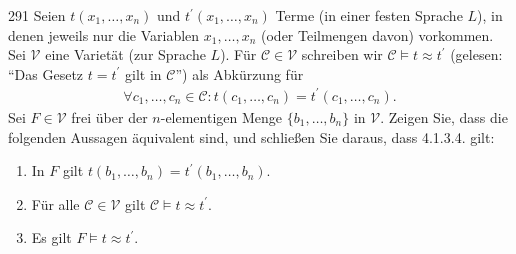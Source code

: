 \begin{algebraUE}{291}
Seien $t(x_1,\dots,x_n)$ und $t^{\prime}(x_1,\dots,x_n)$ Terme (in einer festen
Sprache $L$), in denen jeweils nur die Variablen $x_1,\dots,x_n$ (oder Teilmengen
davon) vorkommen. Sei $\mathcal{V}$ eine Varietät (zur Sprache $L$). Für $\mathcal{C} \in \mathcal{V}$
schreiben wir $\mathcal{C} \vDash t \approx t^{\prime}$ (gelesen: ``Das Gesetz $t = t^{\prime}$
gilt in $\mathcal{C}$'') als Abkürzung für
\begin{align*}
  \forall c_1,\dots,c_n \in \mathcal{C}: t(c_1,\dots,c_n) = t^{\prime}(c_1,\dots,c_n).
\end{align*}
Sei $F \in \mathcal{V}$ frei über der $n$-elementigen Menge $\{b_1,\dots,b_n\}$ in $\mathcal{V}$.
Zeigen Sie, dass die folgenden Aussagen äquivalent sind, und schließen Sie daraus, dass 4.1.3.4. gilt:
\begin{enumerate}[label = (\alph*)]
  \item In $F$ gilt $t(b_1,\dots,b_n) = t^{\prime}(b_1,\dots,b_n)$.
  \item Für alle $\mathcal{C} \in \mathcal{V}$ gilt $\mathcal{C} \vDash t \approx t^{\prime}$.
  \item Es gilt $F \vDash t \approx t^{\prime}$.
\end{enumerate}
\end{algebraUE}
